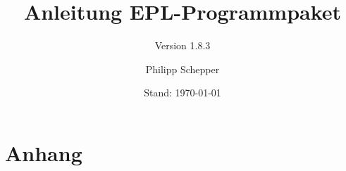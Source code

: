 \documentclass[a4paper,ngerman,oneside]{scrbook}
\title{Anleitung EPL-Programmpaket}
\subtitle{Version 1.8.3}
\author{Philipp Schepper}
\date{Stand: \today}
\begin{document}
\maketitle

\frontmatter
\tableofcontents


\mainmatter






\appendix
\part{Anhang}



\end{document}
